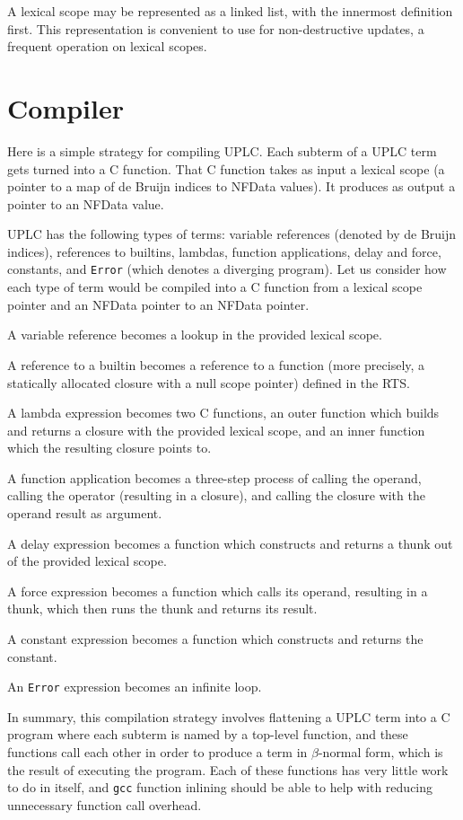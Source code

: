 \documentclass[12pt]{article}
\begin{document}
A lexical scope may be represented as a linked list, with the innermost definition first. This representation is convenient to use for non-destructive updates, a frequent operation on lexical scopes.

\section{Compiler}

Here is a simple strategy for compiling UPLC. Each subterm of a UPLC term gets turned into a C function. That C function takes as input a lexical scope (a pointer to a map of de Bruijn indices to NFData values). It produces as output a pointer to an NFData value.

UPLC has the following types of terms: variable references (denoted by de Bruijn indices), references to builtins, lambdas, function applications, delay and force, constants, and \texttt{Error} (which denotes a diverging program). Let us consider how each type of term would be compiled into a C function from a lexical scope pointer and an NFData pointer to an NFData pointer.

A variable reference becomes a lookup in the provided lexical scope.

A reference to a builtin becomes a reference to a function (more precisely, a statically allocated closure with a null scope pointer) defined in the RTS.

A lambda expression becomes two C functions, an outer function which builds and returns a closure with the provided lexical scope, and an inner function which the resulting closure points to.

A function application becomes a three-step process of calling the operand, calling the operator (resulting in a closure), and calling the closure with the operand result as argument.

A delay expression becomes a function which constructs and returns a thunk out of the provided lexical scope.

A force expression becomes a function which calls its operand, resulting in a thunk, which then runs the thunk and returns its result.

A constant expression becomes a function which constructs and returns the constant.

An \texttt{Error} expression becomes an infinite loop.

In summary, this compilation strategy involves flattening a UPLC term into a C program where each subterm is named by a top-level function, and these functions call each other in order to produce a term in $\beta$-normal form, which is the result of executing the program. Each of these functions has very little work to do in itself, and \texttt{gcc} function inlining should be able to help with reducing unnecessary function call overhead.
\end{document}
